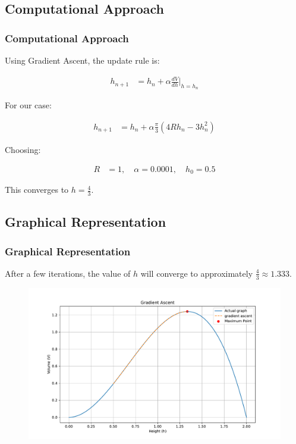 \documentclass{beamer}
\numberwithin{equation}{section}
\begin{document}
\subsection{Computational Approach}
\begin{frame}
\frametitle{Computational Approach}
Using Gradient Ascent, the update rule is:

\begin{align}
h_{n+1} &= h_n + \alpha \frac{dV}{dh} \Big|_{h=h_n}
\end{align}

For our case:

\begin{align}
h_{n+1} &= h_n + \alpha \frac{\pi}{3} (4Rh_n - 3h_n^2)
\end{align}

Choosing:

\begin{align}
R &= 1, \quad \alpha = 0.0001, \quad h_0 = 0.5
\end{align}

This converges to $h = \frac{4}{3}$.
\end{frame}

\subsection{Graphical Representation}
\begin{frame}
\frametitle{Graphical Representation}
After a few iterations, the value of $h$ will converge to approximately $\frac{4}{3} \approx 1.333$.
\begin{figure}[h]
\centering
\includegraphics[width=0.9\linewidth]{figs/plot.pdf}
\end{figure}
\end{frame}
\end{document}
